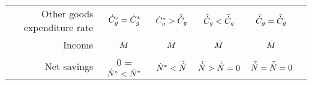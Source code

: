 \begin{landscape}
\begin{table}
\begin{tabular}{r c c c c c}
%
Other goods expenditure rate      & ${}{\dot{C}}^{\scriptscriptstyle \circ}_g  = {\dot{C}}^*_g$         
                                  & ${\dot{C}}^*_g   > \hat{\dot{C}}_g$ 
                                  & $\hat{\dot{C}}_g   < \bar{\dot{C}}_g$ 
                                  & $\bar{\dot{C}}_g = \tilde{\dot{C}}_g$ \\
%
Income                            & $\dot{M}$         
                                  & $\dot{M}$ 
                                  & $\dot{M}$ 
                                  & $\dot{M}$  \\
%
Net savings                       & 0 = ${}{\dot{N}}^{\scriptscriptstyle \circ} <   {\dot{N}}^*$         
                                  & ${\dot{N}}^*      <   \hat{\dot{N}}$ 
                                  & $\hat{\dot{N}}      >   \bar{\dot{N}} = 0$ 
                                  & $\bar{\dot{N}}    =   \tilde{\dot{N}} = 0$  \\
\bottomrule
\end{tabular}


\end{table}

\end{landscape}

